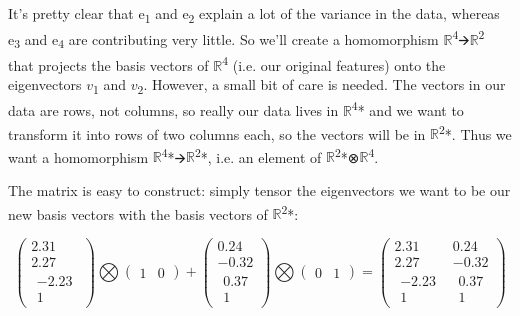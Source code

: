 \documentclass[oneside,english]{amsbook}
\numberwithin{section}{chapter}
\theoremstyle{plain}
\theoremstyle{definition}
\begin{document}
It's pretty clear that e\textsubscript{1} and e\textsubscript{2} explain
a lot of the variance in the data, whereas e\textsubscript{3} and
e\textsubscript{4} are contributing very little. So we'll create a
homomorphism $\mathbb{R}$\textsuperscript{4}🡪$\mathbb{R}$\textsuperscript{2}
that projects the basis vectors of $\mathbb{R}$\textsuperscript{4} (i.e.
our original features) onto the eigenvectors ­$v$\textsubscript{1} and
$v$\textsubscript{2}. However, a small bit of care is needed. The
vectors in our data are rows, not columns, so really our data lives in
$\mathbb{R}$\textsuperscript{4}* and we want to transform it into rows of
two columns each, so the vectors will be in
$\mathbb{R}$\textsuperscript{2}*. Thus we want a homomorphism
$\mathbb{R}$\textsuperscript{4}*🡪$\mathbb{R}$\textsuperscript{2}*, i.e. an
element of $\mathbb{R}$\textsuperscript{2}*⊗$\mathbb{R}$\textsuperscript{4}.

The matrix is easy to construct: simply tensor the eigenvectors we want
to be our new basis vectors with the basis vectors of
$\mathbb{R}$\textsuperscript{2}*:

\[\begin{pmatrix}
	2.31 \\
	2.27 \\
	\begin{matrix}
		- 2.23 \\
		1
	\end{matrix}
\end{pmatrix}\bigotimes\begin{pmatrix}
	1 & 0
\end{pmatrix} + \begin{pmatrix}
	0.24 \\
	- 0.32 \\
	\begin{matrix}
		0.37 \\
		1
	\end{matrix}
\end{pmatrix}\bigotimes\begin{pmatrix}
	0 & 1
\end{pmatrix} = \begin{pmatrix}
	2.31 & 0.24 \\
	2.27 & - 0.32 \\
	\begin{matrix}
		- 2.23 \\
		1
	\end{matrix} & \begin{matrix}
		0.37 \\
		1
	\end{matrix}
\end{pmatrix}\]
\end{document}
